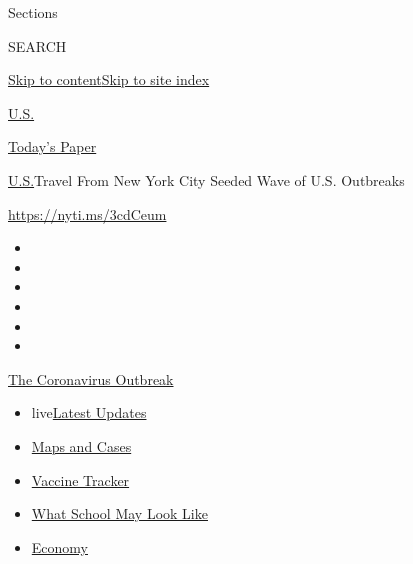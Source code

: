 Sections

SEARCH

\protect\hyperlink{site-content}{Skip to
content}\protect\hyperlink{site-index}{Skip to site index}

\href{https://www.nytimes.com/section/us}{U.S.}

\href{https://myaccount.nytimes.com/auth/login?response_type=cookie\&client_id=vi}{}

\href{https://www.nytimes.com/section/todayspaper}{Today's Paper}

\href{/section/us}{U.S.}\textbar{}Travel From New York City Seeded Wave
of U.S. Outbreaks

\url{https://nyti.ms/3cdCeum}

\begin{itemize}
\item
\item
\item
\item
\item
\item
\end{itemize}

\href{https://www.nytimes.com/news-event/coronavirus?action=click\&pgtype=Article\&state=default\&region=TOP_BANNER\&context=storylines_menu}{The
Coronavirus Outbreak}

\begin{itemize}
\tightlist
\item
  live\href{https://www.nytimes.com/2020/08/02/world/coronavirus-updates.html?action=click\&pgtype=Article\&state=default\&region=TOP_BANNER\&context=storylines_menu}{Latest
  Updates}
\item
  \href{https://www.nytimes.com/interactive/2020/us/coronavirus-us-cases.html?action=click\&pgtype=Article\&state=default\&region=TOP_BANNER\&context=storylines_menu}{Maps
  and Cases}
\item
  \href{https://www.nytimes.com/interactive/2020/science/coronavirus-vaccine-tracker.html?action=click\&pgtype=Article\&state=default\&region=TOP_BANNER\&context=storylines_menu}{Vaccine
  Tracker}
\item
  \href{https://www.nytimes.com/interactive/2020/07/29/us/schools-reopening-coronavirus.html?action=click\&pgtype=Article\&state=default\&region=TOP_BANNER\&context=storylines_menu}{What
  School May Look Like}
\item
  \href{https://www.nytimes.com/live/2020/07/31/business/stock-market-today-coronavirus?action=click\&pgtype=Article\&state=default\&region=TOP_BANNER\&context=storylines_menu}{Economy}
\end{itemize}


